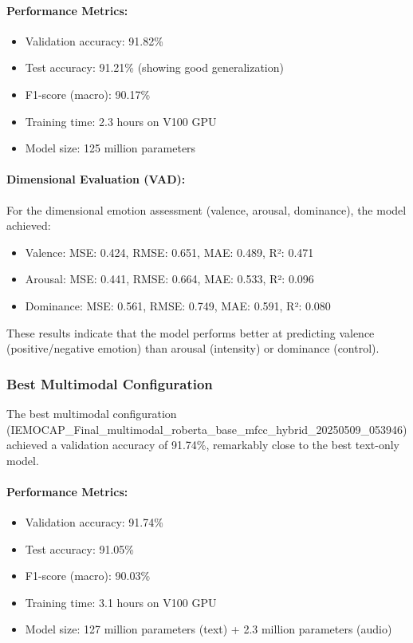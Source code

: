 \documentclass[12pt]{article}
\begin{document}
\paragraph{Performance Metrics:}
\begin{itemize}
    \item Validation accuracy: 91.82\%
    \item Test accuracy: 91.21\% (showing good generalization)
    \item F1-score (macro): 90.17\%
    \item Training time: 2.3 hours on V100 GPU
    \item Model size: 125 million parameters
\end{itemize}

\paragraph{Dimensional Evaluation (VAD):}
For the dimensional emotion assessment (valence, arousal, dominance), the model achieved:
\begin{itemize}
    \item Valence: MSE: 0.424, RMSE: 0.651, MAE: 0.489, R²: 0.471
    \item Arousal: MSE: 0.441, RMSE: 0.664, MAE: 0.533, R²: 0.096
    \item Dominance: MSE: 0.561, RMSE: 0.749, MAE: 0.591, R²: 0.080
\end{itemize}

These results indicate that the model performs better at predicting valence (positive/negative emotion) than arousal (intensity) or dominance (control).

\subsubsection{Best Multimodal Configuration}
The best multimodal configuration (IEMOCAP\_Final\_multimodal\_roberta\_base\_mfcc\_hybrid\_20250509\_053946) achieved a validation accuracy of 91.74\%, remarkably close to the best text-only model.

\paragraph{Performance Metrics:}
\begin{itemize}
    \item Validation accuracy: 91.74\%
    \item Test accuracy: 91.05\%
    \item F1-score (macro): 90.03\%
    \item Training time: 3.1 hours on V100 GPU
    \item Model size: 127 million parameters (text) + 2.3 million parameters (audio)
\end{itemize}
\end{document}
